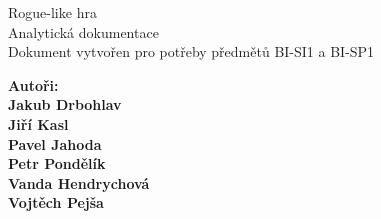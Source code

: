 \documentclass[12pt,a4paper]{article}
\begin{document}



\renewcommand{\headrulewidth}{0pt}
\renewcommand{\footrulewidth}{0pt}

\begin{titlepage}
  \thispagestyle{fancy}
  
	\vspace*{\fill}
	\begin{center}
    {\fontsize{28.83}{100}\selectfont Rogue-like hra}\\[0.6cm] %
		{\fontsize{15.74}{40}\selectfont Analytická dokumentace}\\[1.5cm]
    {\fontsize{10}{10} \selectfont Dokument vytvořen pro potřeby předmětů
    BI-SI1 a BI-SP1}\\
	\end{center}
  
	\vspace*{\fill}
  
  {\fontsize{10}{10} \selectfont \noindent
  \bf Autoři:\rm\\
  Jakub Drbohlav\\
  Jiří Kasl\\
  Pavel Jahoda\\
  Petr Pondělík\\
  Vanda Hendrychová\\
  Vojtěch Pejša\\
  }
\end{titlepage}

\newpage

\renewcommand{\headrulewidth}{0.4pt}
\renewcommand{\footrulewidth}{0.4pt}






\tableofcontents

\newpage

\listoffigures

\newpage
\end{document}
